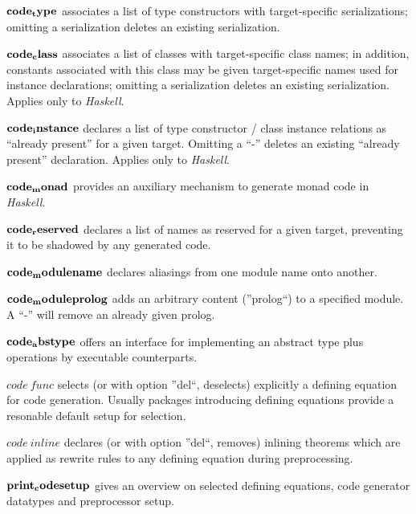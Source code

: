 \begin{descr}
\item [${\mathord{\mathbf{code_type}}}$] associates a list of type constructors
  with target-specific serializations; omitting a serialization
  deletes an existing serialization.

\item [${\mathord{\mathbf{code_class}}}$] associates a list of classes
  with target-specific class names; in addition, constants associated
  with this class may be given target-specific names used for instance
  declarations; omitting a serialization
  deletes an existing serialization.  Applies only to \emph{Haskell}.

\item [${\mathord{\mathbf{code_instance}}}$] declares a list of type constructor / class
  instance relations as ``already present'' for a given target.
  Omitting a ``-'' deletes an existing ``already present'' declaration.
  Applies only to \emph{Haskell}.

\item [${\mathord{\mathbf{code_monad}}}$] provides an auxiliary mechanism
  to generate monad code in \emph{Haskell}.

\item [${\mathord{\mathbf{code_reserved}}}$] declares a list of names
  as reserved for a given target, preventing it to be shadowed
  by any generated code.

\item [${\mathord{\mathbf{code_modulename}}}$] declares aliasings from one module name
  onto another.

\item [${\mathord{\mathbf{code_moduleprolog}}}$] adds an arbitrary content (''prolog``)
  to a specified module. A ``-'' will remove an already given prolog.

\item [${\mathord{\mathbf{code_abstype}}}$] offers an interface for implementing
  an abstract type plus operations by executable counterparts.

\item [$code\ func$] selects (or with option ''del``, deselects) explicitly
  a defining equation for code generation.  Usually packages introducing
  defining equations provide a resonable default setup for selection.

\item [$code\ inline$] declares (or with option ''del``, removes)
  inlining theorems which are applied as rewrite rules to any defining equation
  during preprocessing.

\item [${\mathord{\mathbf{print_codesetup}}}$] gives an overview on selected
  defining equations, code generator datatypes and preprocessor setup.

\end{descr}

